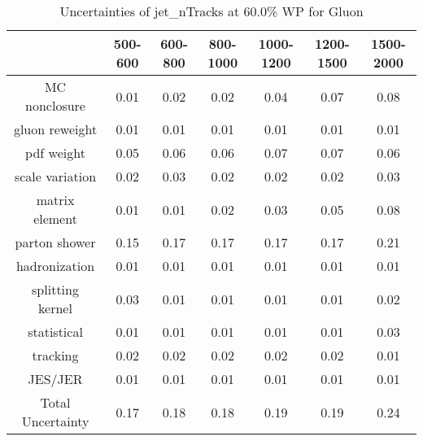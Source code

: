 \begin{table}
\centering
\caption{Uncertainties of jet_nTracks at 60.0\% WP for Gluon}
\label{tab:syst_jet_nTracks_0.6_Gluon}
\begin{tabular}{ccccccc}
\toprule
{} &  500-600 &  600-800 &  800-1000 &  1000-1200 &  1200-1500 &  1500-2000 \\
\midrule
MC nonclosure     &     0.01 &     0.02 &      0.02 &       0.04 &       0.07 &       0.08 \\
gluon reweight    &     0.01 &     0.01 &      0.01 &       0.01 &       0.01 &       0.01 \\
pdf weight        &     0.05 &     0.06 &      0.06 &       0.07 &       0.07 &       0.06 \\
scale variation   &     0.02 &     0.03 &      0.02 &       0.02 &       0.02 &       0.03 \\
matrix element    &     0.01 &     0.01 &      0.02 &       0.03 &       0.05 &       0.08 \\
parton shower     &     0.15 &     0.17 &      0.17 &       0.17 &       0.17 &       0.21 \\
hadronization     &     0.01 &     0.01 &      0.01 &       0.01 &       0.01 &       0.01 \\
splitting kernel  &     0.03 &     0.01 &      0.01 &       0.01 &       0.01 &       0.02 \\
statistical       &     0.01 &     0.01 &      0.01 &       0.01 &       0.01 &       0.03 \\
tracking          &     0.02 &     0.02 &      0.02 &       0.02 &       0.02 &       0.01 \\
JES/JER           &     0.01 &     0.01 &      0.01 &       0.01 &       0.01 &       0.01 \\
Total Uncertainty &     0.17 &     0.18 &      0.18 &       0.19 &       0.19 &       0.24 \\
\bottomrule
\end{tabular}
\end{table}
